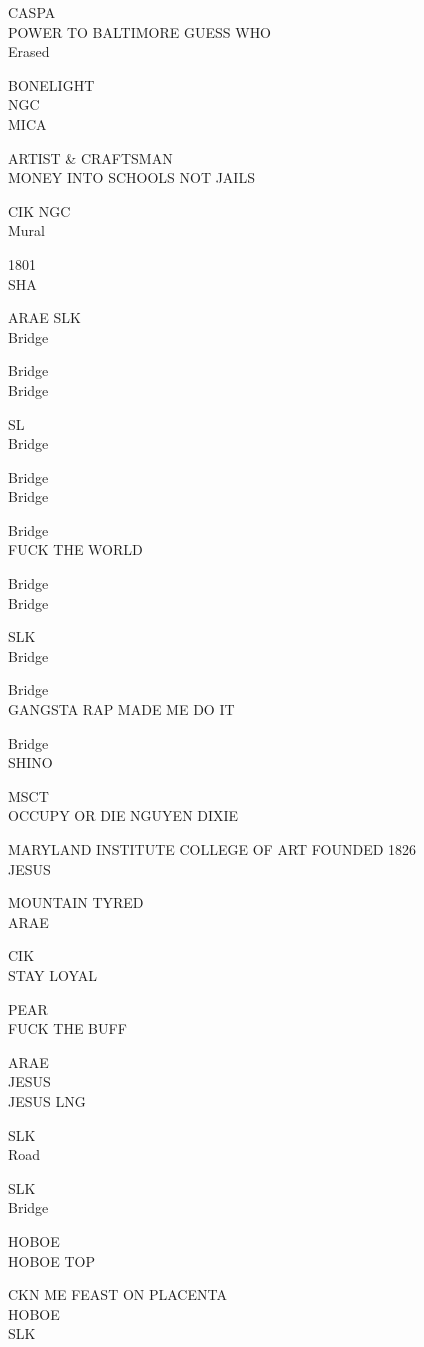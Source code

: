 \documentclass[10pt,letterpaper]{article}
\begin{document}
CASPA\\
POWER TO BALTIMORE GUESS WHO\\
Erased

BONELIGHT\\
NGC\\
MICA

ARTIST \& CRAFTSMAN\\
MONEY INTO SCHOOLS NOT JAILS

CIK NGC\\
Mural

1801\\
SHA

ARAE SLK\\
Bridge

Bridge\\
Bridge

SL\\
Bridge

Bridge\\
Bridge

Bridge\\
FUCK THE WORLD

Bridge\\
Bridge

SLK\\
Bridge

Bridge\\
GANGSTA RAP MADE ME DO IT

Bridge\\
SHINO

MSCT\\
OCCUPY OR DIE NGUYEN DIXIE

MARYLAND INSTITUTE COLLEGE OF ART FOUNDED 1826\\
JESUS

MOUNTAIN TYRED\\
ARAE

CIK\\
STAY LOYAL

PEAR\\
FUCK THE BUFF

ARAE\\
JESUS\\
JESUS LNG

SLK\\
Road

SLK\\
Bridge

HOBOE\\
HOBOE TOP

CKN ME FEAST ON PLACENTA\\
HOBOE\\
SLK
\end{document}
